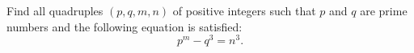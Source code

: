 Find all quadruples $(p,q,m,n)$ of positive integers such that $p$ and $q$ are prime numbers
and the following equation is satisfied:
$$p^m-q^3=n^3.$$